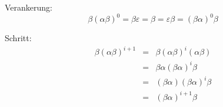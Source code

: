 \documentclass[11pt]{article} %
\theoremstyle{definition}
\begin{document}
\begin{enumerate}[(a)]
Verankerung:
\[
\beta(\alpha\beta)^0 = \beta\varepsilon = \beta = \varepsilon\beta = (\beta\alpha)^0\beta
\]

Schritt:
\begin{eqnarray*}
\beta(\alpha\beta)^{i+1} &=& \beta(\alpha\beta)^{i}(\alpha\beta) \\
&=& \beta\alpha(\beta\alpha)^{i}\beta \\
&=& (\beta\alpha)(\beta\alpha)^{i}\beta \\
&=& (\beta\alpha)^{i+1} \beta
\end{eqnarray*}

\end{enumerate}
\end{document}
